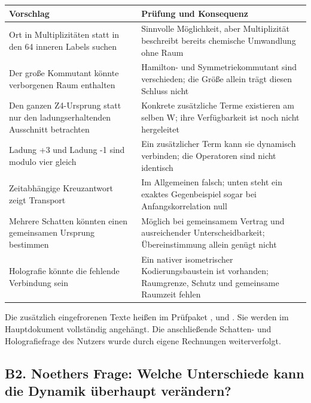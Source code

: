 {\def\LTcaptype{none} %
\begin{longtable}[]{@{}
  >{\raggedright\arraybackslash}p{}
  >{\raggedright\arraybackslash}p{}@{}}
\toprule\noalign{}
\begin{minipage}[b]{\linewidth}\raggedright
Vorschlag
\end{minipage} & \begin{minipage}[b]{\linewidth}\raggedright
Prüfung und Konsequenz
\end{minipage} \\
\midrule\noalign{}
\endhead
\bottomrule\noalign{}
\endlastfoot
Ort in Multiplizitäten statt in den 64 inneren Labels suchen & Sinnvolle
Möglichkeit, aber Multiplizität beschreibt bereits chemische Umwandlung
ohne Raum \\
Der große Kommutant könnte verborgenen Raum enthalten & Hamilton- und
Symmetriekommutant sind verschieden; die Größe allein trägt diesen
Schluss nicht \\
Den ganzen Z4-Ursprung statt nur den ladungserhaltenden Ausschnitt
betrachten & Konkrete zusätzliche Terme existieren am selben W; ihre
Verfügbarkeit ist noch nicht hergeleitet \\
Ladung +3 und Ladung -1 sind modulo vier gleich & Ein zusätzlicher Term
kann sie dynamisch verbinden; die Operatoren sind nicht identisch \\
Zeitabhängige Kreuzantwort zeigt Transport & Im Allgemeinen falsch;
unten steht ein exaktes Gegenbeispiel sogar bei Anfangskorrelation
null \\
Mehrere Schatten könnten einen gemeinsamen Ursprung bestimmen & Möglich
bei gemeinsamem Vertrag und ausreichender Unterscheidbarkeit;
Übereinstimmung allein genügt nicht \\
Holografie könnte die fehlende Verbindung sein & Ein nativer
isometrischer Kodierungsbaustein ist vorhanden; Raumgrenze, Schutz und
gemeinsame Raumzeit fehlen \\
\end{longtable}
}

Die zusätzlich eingefrorenen Texte heißen im Prüfpaket
, 
und . Sie werden im Hauptdokument
vollständig angehängt. Die anschließende Schatten- und Holografiefrage
des Nutzers wurde durch eigene Rechnungen weiterverfolgt.

\subsection{B2. Noethers Frage: Welche Unterschiede kann die Dynamik
überhaupt
verändern?}\label{b2.-noethers-frage-welche-unterschiede-kann-die-dynamik-uxfcberhaupt-veruxe4ndern}

